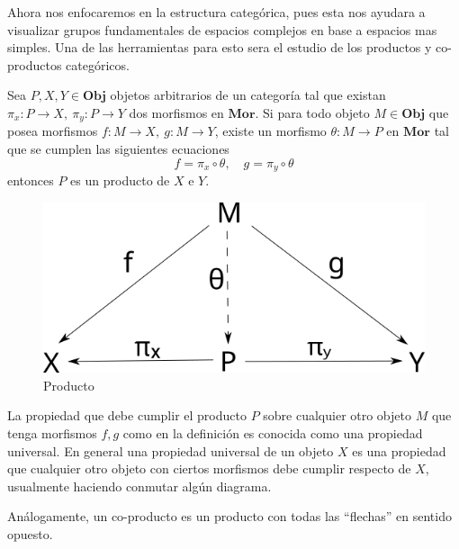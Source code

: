 Ahora nos enfocaremos en la estructura categórica, pues esta nos ayudara
a visualizar grupos fundamentales de espacios complejos en base a
espacios mas simples. Una de las herramientas para esto sera el estudio
de los productos y co-productos categóricos.

\begin{definicion}[Producto]
  Sea \(P , X , Y \in \mathbf {Obj}\) objetos arbitrarios de un categoría
  tal que existan \(\pi_x : P \to X,\ \pi_y : P \to Y\) dos morfismos en
  \(\mathbf {Mor}\). Si para todo objeto \(M \in \mathbf {Obj}\) que
  posea morfismos \( f : M \to X,\ g : M \to Y\), existe un morfismo
  \(\theta : M \to P\) en \(\mathbf{Mor}\) tal que se cumplen las
  siguientes ecuaciones
  \[ f = \pi_x \circ \theta, \quad g = \pi_y \circ \theta \]
  entonces \(P\) es un producto de \(X\) e \(Y\).
  \begin{figure}[h]
    \centering
    \includegraphics[scale=0.5]{./imagenes/producto.png}
    \caption{Producto}
  \end{figure}
\end{definicion}
\begin{acotacion}
  La propiedad que debe cumplir el producto \(P\) sobre cualquier otro
  objeto \(M\) que tenga morfismos \(f,g\) como en la definición es
  conocida como una propiedad universal. En general una propiedad
  universal de un objeto \(X\) es una propiedad que cualquier otro objeto
  con ciertos morfismos debe cumplir respecto de \(X\), usualmente
  haciendo conmutar algún diagrama.
\end{acotacion}
Análogamente, un co-producto es un producto con todas las ``flechas'' en
sentido opuesto.
